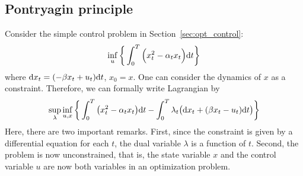 \documentclass[11pt]{book}
\newcommand{\dt}{\text{\normalfont d}t}
\newcommand{\dx}{\text{\normalfont d}x}
\begin{document}
\subsection{Pontryagin principle}
\label{sec:det_pontryagin}
Consider the simple control problem in Section~\ref{sec:opt_control}:
\begin{equation}
\inf_{u}\bigg\{\int_0^T\Big(x_t^2 - \alpha_t x_t\Big) {{\dt}}\bigg\}
\end{equation}
where ${\dx}_t = (-\beta x_t + u_t ){{\dt}}$, $x_0=x$.
One can consider the dynamics of $x$ as a constraint. Therefore, we can formally write Lagrangian by 
\begin{equation}\label{ex:sup_inf}
    \sup_{\lambda}\inf_{u,x}\bigg\{\int_0^T\big(x_t^2 - \alpha_t x_t\big) {{\dt}} - \int_0^T \lambda_t \big({\dx}_t + (\beta x_t  - u_t ){{\dt}}\big)\bigg\}
\end{equation}
Here, there are two important remarks. First,
 since the constraint is given by a differential equation for each $t$, the dual variable $\lambda$ is a function of $t$. Second, the problem is now unconstrained, that is, the state variable $x$ and the control variable $u$ are now both  variables in an optimization problem.
 
\end{document}
